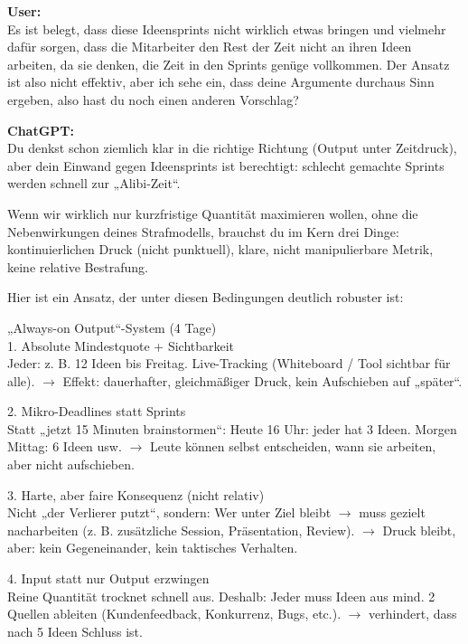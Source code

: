 \begin{userchat}
\textbf{User:}\\
Es ist belegt, dass diese Ideensprints nicht wirklich etwas bringen und vielmehr dafür sorgen, dass die Mitarbeiter den Rest der Zeit nicht an ihren Ideen arbeiten, da sie denken, die Zeit in den Sprints genüge vollkommen. Der Ansatz ist also nicht effektiv, aber ich sehe ein, dass deine Argumente durchaus Sinn ergeben, also hast du noch einen anderen Vorschlag?
\end{userchat}

\begin{kichat}
\textbf{ChatGPT:}\\
Du denkst schon ziemlich klar in die richtige Richtung (Output unter Zeitdruck), aber dein Einwand gegen Ideensprints ist berechtigt: schlecht gemachte Sprints werden schnell zur „Alibi-Zeit“.

Wenn wir wirklich nur kurzfristige Quantität maximieren wollen, ohne die Nebenwirkungen deines Strafmodells, brauchst du im Kern drei Dinge: kontinuierlichen Druck (nicht punktuell), klare, nicht manipulierbare Metrik, keine relative Bestrafung.

Hier ist ein Ansatz, der unter diesen Bedingungen deutlich robuster ist:

„Always-on Output“-System (4 Tage)\\
1. Absolute Mindestquote + Sichtbarkeit\\
Jeder: z. B. 12 Ideen bis Freitag. Live-Tracking (Whiteboard / Tool sichtbar für alle). $\rightarrow$ Effekt: dauerhafter, gleichmäßiger Druck, kein Aufschieben auf „später“.

2. Mikro-Deadlines statt Sprints\\
Statt „jetzt 15 Minuten brainstormen“: Heute 16 Uhr: jeder hat 3 Ideen. Morgen Mittag: 6 Ideen usw. $\rightarrow$ Leute können selbst entscheiden, wann sie arbeiten, aber nicht aufschieben.

3. Harte, aber faire Konsequenz (nicht relativ)\\
Nicht „der Verlierer putzt“, sondern: Wer unter Ziel bleibt $\rightarrow$ muss gezielt nacharbeiten (z. B. zusätzliche Session, Präsentation, Review). $\rightarrow$ Druck bleibt, aber: kein Gegeneinander, kein taktisches Verhalten.

4. Input statt nur Output erzwingen\\
Reine Quantität trocknet schnell aus. Deshalb: Jeder muss Ideen aus mind. 2 Quellen ableiten (Kundenfeedback, Konkurrenz, Bugs, etc.). $\rightarrow$ verhindert, dass nach 5 Ideen Schluss ist.


\end{kichat}
